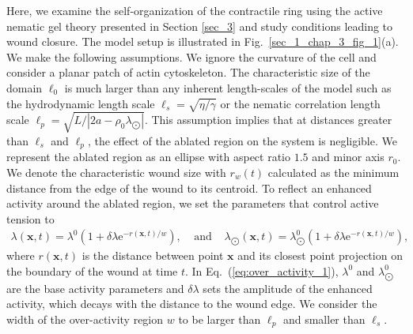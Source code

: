 \documentclass[12pt]{iopart}
\begin{document}
	Here, we examine the self-organization of the contractile ring using the active nematic gel theory presented in Section \ref{sec_3} and study conditions leading to wound closure. The model setup is  illustrated in Fig.~\ref{sec_1_chap_3_fig_1}(a). We make the following assumptions. We ignore the curvature of the cell and consider a  planar patch of actin cytoskeleton. The characteristic size of the domain $ \ell_0$ is much larger than any inherent length-scales of the model such as the hydrodynamic length scale $\ell_s=\sqrt{\eta/\gamma}$ or the nematic correlation length scale $\ell_p=\sqrt{L/|2a-\rho_0\lambda_{\bigodot}|}$. This assumption implies that at distances greater than $\ell_s$ and $\ell_p$, the effect of the ablated region on the system is negligible. We represent the ablated region as an ellipse with aspect ratio $1.5$ and  minor axis $r_0$. We denote the characteristic wound size with $r_w(t)$ calculated as the minimum distance from the edge of the wound to its centroid. To reflect an enhanced activity around the ablated region, we set the parameters that control active tension to
	\begin{eqnarray} 
		\lambda(\bm{x},t)=  \lambda^{0} \left( 1+  \delta \lambda\text{e}^{-r(\bm{x},t)/w}  \right), \;\;\;\;\mbox{and}\;\;\;\;
		\lambda_{\bigodot}(\bm{x},t)=  \lambda^{0}_{\bigodot} \left( 1+   \delta \lambda\text{e}^{-r(\bm{x},t)/w}  \right), \label{eq:over_activity_1}
	\end{eqnarray}
	where $r(\bm{x},t)$ is the distance between point $\bm{x}$ and its closest point projection on the boundary of the wound at time $t$.  In Eq.~(\ref{eq:over_activity_1}), $\lambda^0$ and  $\lambda_{\bigodot}^0$ are the base activity parameters and  $\delta \lambda$ sets the amplitude of the enhanced activity, which decays with the distance to the wound edge. We consider the width of the over-activity region $w$ to be larger than $\ell_p$ and smaller than $\ell_s$. 
	
\end{document}
